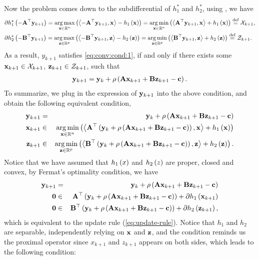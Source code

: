 \documentclass{article}
\begin{document}
Now the problem comes down to the subdifferential of $h_1^*$ and $h_2^*$, using \cite[Corollary 4.21]{beck2017first}, we have 
\begin{align*}
    & \partial h_1^\star\left(-\mathbf{A}^\top \mathbf{y}_{k+1}\right) = \operatorname*{arg\,max}_{\mathbf{x} \in \mathbb{R}^n}\left(\left\langle -\mathbf{A}^\top \mathbf{y}_{k+1}, \mathbf{x} \right\rangle - h_1\left(\mathbf{x}\right)\right) = \operatorname*{arg\,min}_{\mathbf{x} \in \mathbb{R}^n}\left(\left\langle \mathbf{A}^\top \mathbf{y}_{k+1}, \mathbf{x} \right\rangle + h_1\left(\mathbf{x}\right)\right) \stackrel{\text{def}}{=} \mathcal{X}_{k+1}, \\
    & \partial h_2^*\left(-\mathbf{B}^\top \mathbf{y}_{k+1}\right) = \operatorname*{arg\,max}_{\mathbf{z} \in \mathbb{R}^p}\left(\left\langle -\mathbf{B}^\top \mathbf{y}_{k+1}, \mathbf{z} \right\rangle - h_2\left(\mathbf{z}\right)\right) = \operatorname*{arg\,min}_{\mathbf{z} \in \mathbb{R}^p}\left(\left\langle \mathbf{B}^\top \mathbf{y}_{k+1}, \mathbf{z} \right\rangle + h_2\left(\mathbf{z}\right)\right) \stackrel{\text{def}}{=} \mathcal{Z}_{k+1}.
\end{align*}
As a result, $y_{k+1}$ satisfies \cref{eq:conv:cond:1}, if and only if there exists some $\mathbf{x}_{k+1} \in \mathcal{X}_{k+1}$, $\mathbf{z}_{k+1} \in \mathcal{Z}_{k+1}$, such that 
\begin{align}
    \label{eq:update-rule}
    \mathbf{y}_{k+1} = \mathbf{y}_k + \rho\left(\mathbf{A}\mathbf{x}_{k+1} + \mathbf{B}\mathbf{z}_{k+1} - \mathbf{c}\right).
\end{align}
To summarize, we plug in the expression of $\mathbf{y}_{k+1}$ into the above condition, and obtain the following equivalent condition,
\begin{eqnarray*}
    \mathbf{y}_{k+1} &=& \mathbf{y}_k + \rho\left(\mathbf{A}\mathbf{x}_{k+1} + \mathbf{B}\mathbf{z}_{k+1} - \mathbf{c}\right) \\
    \mathbf{x}_{k+1} &\in& \operatorname*{arg\,min}_{\mathbf{x} \in \mathbb{R}^n}\left(\left\langle \mathbf{A}^\top \left(\mathbf{y}_k + \rho\left(\mathbf{A}\mathbf{x}_{k+1} + \mathbf{B}\mathbf{z}_{k+1} - \mathbf{c}\right)\right), \mathbf{x} \right\rangle + h_1\left(\mathbf{x}\right)\right) \\
    \mathbf{z}_{k+1} &\in& \operatorname*{arg\,min}_{\mathbf{z} \in \mathbb{R}^p}\left(\left\langle \mathbf{B}^\top \left(\mathbf{y}_k + \rho\left(\mathbf{A}\mathbf{x}_{k+1} + \mathbf{B}\mathbf{z}_{k+1} - \mathbf{c}\right)\right), \mathbf{z} \right\rangle + h_2\left(\mathbf{z}\right)\right).
\end{eqnarray*}
Notice that we have assumed that $h_1\left(x\right)$ and $h_2\left(z\right)$ are proper, closed and convex, by Fermat's optimality condition, we have 
\begin{eqnarray*}
    \mathbf{y}_{k+1} &=& \mathbf{y}_k + \rho\left(\mathbf{A}\mathbf{x}_{k+1} + \mathbf{B}\mathbf{z}_{k+1} - \mathbf{c}\right) \\
    \mathbf{0} &\in& \mathbf{A}^\top \left(\mathbf{y}_k + \rho\left(\mathbf{A}\mathbf{x}_{k+1} + \mathbf{B}\mathbf{z}_{k+1} - \mathbf{c}\right)\right) + \partial h_1\left(\mathbf{x}_{k+1}\right) \\
    \mathbf{0} &\in& \mathbf{B}^\top \left(\mathbf{y}_k + \rho\left(\mathbf{A}\mathbf{x}_{k+1} + \mathbf{B}\mathbf{z}_{k+1} - \mathbf{c}\right)\right) + \partial h_2\left(\mathbf{z}_{k+1}\right),
\end{eqnarray*}
which is equivalent to the update rule (\ref{eq:update-rule}).
Notice that $h_1$ and $h_2$ are separable, independently relying on $\mathbf{x}$ and $\mathbf{z}$, and the condition reminds us the proximal operator since $x_{k+1}$ and $z_{k+1}$ appears on both sides, which leads to the following condition:
\end{document}

